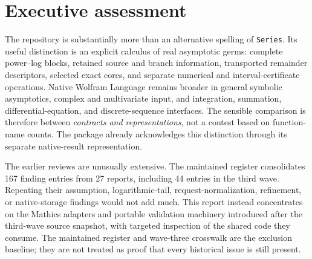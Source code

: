 \documentclass[11pt,a4paper]{article}
\newcommand{\code}[1]{\texttt{#1}}
\begin{document}
\section*{Executive assessment}
The repository is substantially more than an alternative spelling of \code{Series}. Its useful distinction is an explicit calculus of real asymptotic germs: complete power--log blocks, retained source and branch information, transported remainder descriptors, selected exact cores, and separate numerical and interval-certificate operations. Native Wolfram Language remains broader in general symbolic asymptotics, complex and multivariate input, and integration, summation, differential-equation, and discrete-sequence interfaces. The sensible comparison is therefore between \emph{contracts and representations}, not a contest based on function-name counts. The package already acknowledges this distinction through its separate native-result representation.\cite{repo,coreentry,native,wlseries,wlasymptotic,wldiscrete}

The earlier reviews are unusually extensive. The maintained register consolidates 167 finding entries from 27 reports, including 44 entries in the third wave. Repeating their assumption, logarithmic-tail, request-normalization, refinement, or native-storage findings would not add much. This report instead concentrates on the Mathics adapters and portable validation machinery introduced after the third-wave source snapshot, with targeted inspection of the shared code they consume. The maintained register and wave-three crosswalk are the exclusion baseline; they are not treated as proof that every historical issue is still present.\cite{register,intake}
\end{document}
